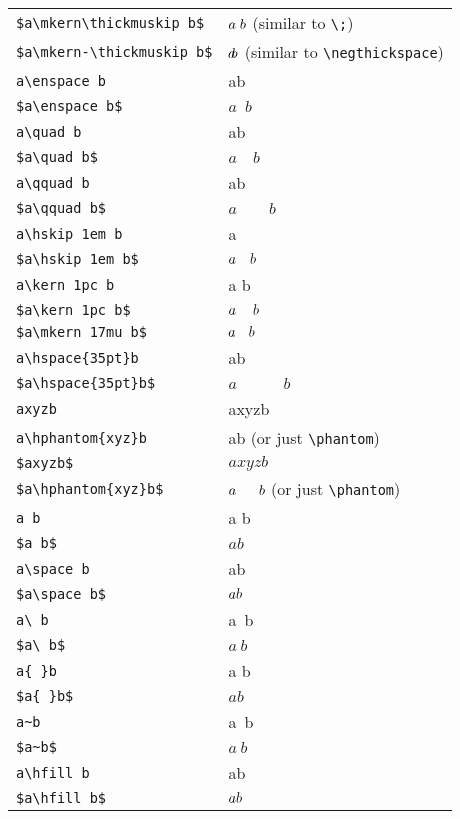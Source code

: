\begin{tabular}{lp{5cm}}
  \verb|$a\mkern\thickmuskip b$|  & $a\mkern\thickmuskip b$ (similar to \verb|\;|) \\
  \verb|$a\mkern-\thickmuskip b$| & $a\mkern-\thickmuskip b$ (similar to \verb|\negthickspace|) \\
  \verb|a\enspace b|              & a\enspace b \\
  \verb|$a\enspace b$|            & $a\enspace b$ \\
  \verb|a\quad b|                 & a\quad b \\
  \verb|$a\quad b$|               & $a\quad b$ \\
  \verb|a\qquad b|                & a\qquad b \\
  \verb|$a\qquad b$|              & $a\qquad b$ \\
  \verb|a\hskip 1em b|            & a\hskip 1em b \\
  \verb|$a\hskip 1em b$|          & $a\hskip 1em b$ \\
  \verb|a\kern 1pc b|             & a\kern 1pc b \\
  \verb|$a\kern 1pc b$|           & $a\kern 1pc b$ \\
  \verb|$a\mkern 17mu b$|         & $a\mkern 17mu b$ \\
  \verb|a\hspace{35pt}b|          & a\hspace{35pt}b \\
  \verb|$a\hspace{35pt}b$|        & $a\hspace{35pt}b$ \\
  \verb|axyzb|                    & axyzb \\
  \verb|a\hphantom{xyz}b|         & a\hphantom{xyz}b (or just \verb|\phantom|) \\
  \verb|$axyzb$|                  & $axyzb$ \\
  \verb|$a\hphantom{xyz}b$|       & $a\hphantom{xyz}b$ (or just \verb|\phantom|) \\
  \verb|a b|                      & a b \\
  \verb|$a b$|                    & $a b$ \\
  \verb|a\space b|                & a\space b \\
  \verb|$a\space b$|              & $a\space b$ \\
  \verb|a\ b|                     & a\ b \\
  \verb|$a\ b$|                   & $a\ b$ \\
  \verb|a{ }b|                    & a{ }b \\
  \verb|$a{ }b$|                  & $a{ }b$ \\
  \verb|a~b|                      & a~b \\
  \verb|$a~b$|                    & $a~b$ \\
  \verb|a\hfill b|                & a\hfill b \\
  \verb|$a\hfill b$|              & $a\hfill b$
\end{tabular}

\begin{align*}
\end{align*}

\begin{equation}
\end{equation}

\begin{enumerate}
\end{enumerate}

